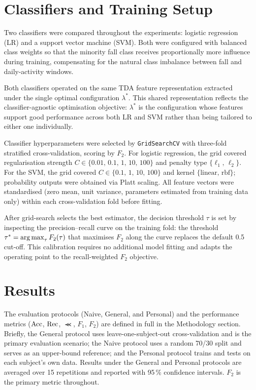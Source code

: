 \section{Classifiers and Training Setup}
\label{sec:exp:classifiers}

Two classifiers were compared throughout the experiments: logistic regression (LR) and a support vector machine (SVM). Both were configured with balanced class weights so that the minority fall class receives proportionally more influence during training, compensating for the natural class imbalance between fall and daily-activity windows.

Both classifiers operated on the same TDA feature representation extracted under the single optimal configuration $\lambda^*$. This shared representation reflects the classifier-agnostic optimisation objective: $\lambda^*$ is the configuration whose features support good performance across both LR and SVM rather than being tailored to either one individually.

Classifier hyperparameters were selected by \texttt{GridSearchCV} with three-fold stratified cross-validation, scoring by $F_2$. For logistic regression, the grid covered regularisation strength $C \in \{0.01,\,0.1,\,1,\,10,\,100\}$ and penalty type $\{\ell_1,\,\ell_2\}$. For the SVM, the grid covered $C \in \{0.1,\,1,\,10,\,100\}$ and kernel $\{\text{linear},\,\text{rbf}\}$; probability outputs were obtained via Platt scaling. All feature vectors were standardised (zero mean, unit variance, parameters estimated from training data only) within each cross-validation fold before fitting.

After grid-search selects the best estimator, the decision threshold $\tau$ is set by inspecting the precision--recall curve on the training fold: the threshold $\tau^* = \operatorname*{arg\,max}_\tau F_2(\tau)$ that maximises $F_2$ along the curve replaces the default 0.5 cut-off. This calibration requires no additional model fitting and adapts the operating point to the recall-weighted $F_2$ objective.

\section{Results}
\label{subsec:results}

The evaluation protocols (Naive, General, and Personal) and the performance metrics ($\operatorname{Acc}$, $\operatorname{Rec}$, $\Prec$, $F_1$, $F_2$) are defined in full in the Methodology section. Briefly, the General protocol uses leave-one-subject-out cross-validation and is the primary evaluation scenario; the Naive protocol uses a random 70/30 split and serves as an upper-bound reference; and the Personal protocol trains and tests on each subject's own data. Results under the General and Personal protocols are averaged over 15 repetitions and reported with 95\,\% confidence intervals. $F_2$ is the primary metric throughout.

